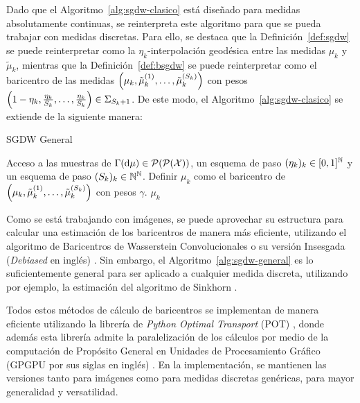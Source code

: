 Dado que el Algoritmo~\ref{alg:sgdw-clasico} está diseñado para medidas absolutamente continuas, se reinterpreta este algoritmo para que se pueda trabajar con medidas discretas. Para ello, se destaca que la Definición~\ref{def:sgdw} se puede reinterpretar como la $\eta_k$-interpolación geodésica entre las medidas $\mu_k$ y $\tilde \mu_k$, mientras que la Definición~\ref{def:bsgdw} se puede reinterpretar como el baricentro de las medidas $\qty( \mu_k, \tilde\mu_k^{(1)}, \dots, \tilde\mu_k^{(S_k)} )$ con pesos $\qty(1-\eta_k, \frac{\eta_k}{S_k}, \dots, \frac{\eta_k}{S_k}) \in \Simplex[S_k+1]$. De este modo, el Algoritmo~\ref{alg:sgdw-clasico} se extiende de la siguiente manera:
\begin{algorithm}[H]
    \caption{SGDW General}
    \label{alg:sgdw-general}
    \begin{algorithmic}[1]
        \Require Acceso a las muestras de $\Gamma(\dd \mu) \in \ProbSpace[\ProbSpace]$, un esquema de paso $(\eta_k)_k \in [0, 1]^\N$ y un esquema de paso $(S_k)_k \in \N^\N$.
        \Repeat
        \State Definir $\mu_k$ como el baricentro de $\qty( \mu_k, \tilde\mu_k^{(1)}, \dots, \tilde\mu_k^{(S_k)} )$ con pesos $\gamma$.
        \State\Return $\mu_k$
    \end{algorithmic}
\end{algorithm}


Como se está trabajando con imágenes, se puede aprovechar su estructura para calcular una estimación de los baricentros de manera más eficiente, utilizando el algoritmo de Baricentros de Wasserstein Convolucionales \cite{solomon2015convolutional} o su versión Insesgada (\textit{Debiased} en inglés) \cite{janati2020debiased}. Sin embargo, el Algoritmo~\ref{alg:sgdw-general} es lo suficientemente general para ser aplicado a cualquier medida discreta, utilizando por ejemplo, la estimación del algoritmo de Sinkhorn \cite{cuturi2013sinkhorn}.

Todos estos métodos de cálculo de baricentros se implementan de manera eficiente utilizando la librería de \textit{Python Optimal Transport} (POT) \cite{flamary2021pot}, donde además esta librería admite la paralelización de los cálculos por medio de la computación de Propósito General en Unidades de Procesamiento Gráfico (GPGPU por sus siglas en inglés) \cite{owens2008gpu}. En la implementación, se mantienen las versiones tanto para imágenes como para medidas discretas genéricas, para mayor generalidad y versatilidad.

